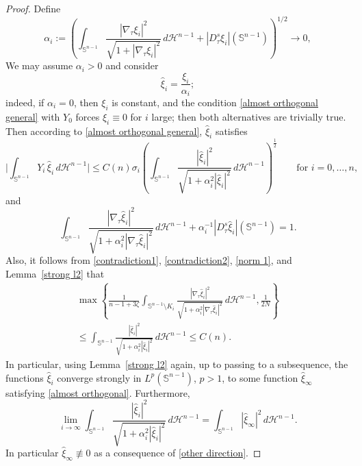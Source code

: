 \documentclass[reqno,11pt]{amsart}
\numberwithin{equation}{section}
\theoremstyle{remark}
\begin{document}
\begin{proof}
Define
$$
\alpha_i:=\left(\int_{\mathbb S^{n-1}}  \frac{|\nabla_\tau  \xi_i|^2}{\sqrt{1+ |\nabla_\tau \xi_i|^2}} \,d\mathscr H^{n-1}
+|D^s_\tau\xi_i|(\mathbb S^{n-1})\right)^{1/2} \to 0,
$$
We may assume $\alpha_i>0$ and consider
$$\hat \xi_i=\frac{\xi_i}{\alpha_i};$$
indeed, if $\alpha_i=0$, then
$\xi_i$ is constant, and the condition \eqref{almost orthogonal general} with $Y_0$ forces
$\xi_i\equiv0$ for $i$ large; then both alternatives are trivially true.
Then according to \eqref{almost orthogonal general}, $\hat \xi_i$ satisfies 
$$\biggl|\int_{\mathbb S^{n-1}} Y_i\,\hat\xi_i \,d\mathscr H^{n-1}\biggr| \leq C(n)\sigma_i \left(\int_{\mathbb S^{n-1}} \frac{|\hat\xi_i|^2}{\sqrt{1+ \alpha_i^2|\hat\xi_i|^2}} \,d\mathscr H^{n-1}\right)^{\frac 1 2}\qquad \text{for }i=0,\ldots,n,$$
and
\begin{equation} \label{norm 1}
\int_{\mathbb S^{n-1}}  \frac{|\nabla_\tau \hat \xi_i|^2}{\sqrt{1+ \alpha_i^2|\nabla_\tau \hat \xi_i|^2}} \,d\mathscr H^{n-1}
+\alpha_i^{-1}|D^s_\tau\hat\xi_i|(\mathbb S^{n-1})=1.
\end{equation}
Also, it follows from \eqref{contradiction1}, \eqref{contradiction2}, \eqref{norm 1}, and Lemma~\ref{strong l2} that
\begin{multline}
\label{other direction}
\max\left\{ \frac{1}{n-1+3 \zeta}\int_{\mathbb S^{n-1}\setminus K_i}  \frac{|\nabla_\tau \hat \xi_i|^2}{\sqrt{1+ \alpha_i^2|\nabla_\tau \hat \xi_i|^2}} \,d\mathscr H^{n-1},
 \frac{1}{2N}\right\}\\
 \le   \int_{\mathbb S^{n-1}} \frac{|\hat \xi_i|^2}{\sqrt{1+  \alpha_i^2 |\hat \xi_i|^2}} \,d\mathscr H^{n-1}\le C(n). 
\end{multline}
In particular, using Lemma~\ref{strong l2} again, up to passing to a subsequence, the functions  $\hat \xi_i$  converge strongly in $L^p(\mathbb S^{n-1})$, $p>1$,
to some function $\hat \xi_\infty$ satisfying \eqref{almost orthogonal}.
Furthermore, 
\begin{equation} \label{norm 2} \lim_{i\to \infty}\int_{\mathbb S^{n-1}} \frac{|\hat \xi_i|^2}{\sqrt{1+\alpha_i^2|\hat\xi_i|^2}} \,d\mathscr H^{n-1}=  \int_{\mathbb S^{n-1}} {|\hat \xi_\infty|^2}  \,d\mathscr H^{n-1}.\end{equation}
In particular $\hat\xi_\infty\not\equiv 0$ as a consequence of \eqref{other direction}. 


\end{proof}
\end{document}
